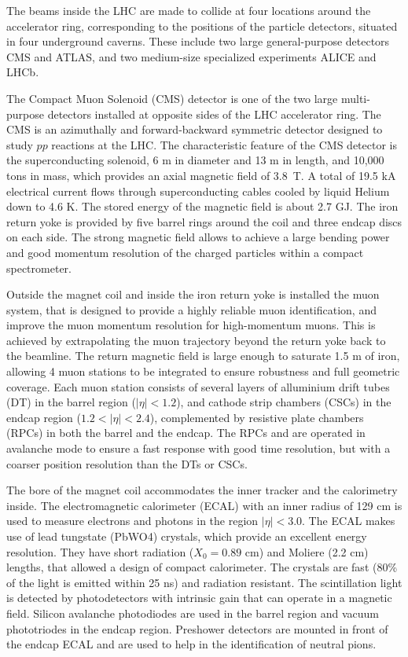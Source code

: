 The beams inside the LHC are made to collide at four locations around the accelerator ring, corresponding 
to the positions of the particle detectors, situated in four underground caverns. These include two large 
general-purpose detectors CMS and ATLAS, and two medium-size specialized experiments ALICE and LHCb.

The Compact Muon Solenoid (CMS) detector is one of the two large multi-purpose detectors 
installed at opposite sides of the LHC accelerator ring. 
The CMS is an azimuthally and forward-backward symmetric 
detector designed to study $pp$ reactions at the LHC.
The characteristic feature of the CMS detector is the superconducting
solenoid, 6 m in diameter and 13 m in length, and 10,000 tons in mass, 
which provides an axial magnetic field of 3.8~T. A total of 19.5 kA electrical current flows through 
superconducting cables cooled by liquid Helium down to 4.6 K.
The stored energy of the magnetic field is about 2.7 GJ.
The iron return yoke is provided by five barrel rings around the coil and three endcap discs on each side. 
The strong magnetic field allows to achieve a large bending power and good 
momentum resolution of the charged particles within a compact spectrometer. 

Outside the magnet coil and inside the iron return yoke is installed the muon system, that 
is designed to provide a highly reliable muon identification, and
improve the muon momentum resolution for high-momentum muons. 
This is achieved by extrapolating 
the muon trajectory beyond the return yoke back to the beamline.
The return magnetic field is large enough
to saturate 1.5 m of iron, allowing 4 muon stations to be integrated to ensure robustness
and full geometric coverage. Each muon station consists of several layers of alluminium drift
tubes (DT) in the barrel region ($|\eta| < 1.2$),
 and cathode strip chambers (CSCs) in the endcap region 
($1.2 < |\eta| < 2.4$),
complemented by resistive plate chambers (RPCs) in 
both the barrel and the endcap. The RPCs 
and are operated in avalanche mode to ensure a fast response 
with good time resolution, 
but with a coarser position resolution than the DTs or CSCs.

The bore of the magnet coil accommodates the inner tracker and the
calorimetry inside. 
The electromagnetic calorimeter (ECAL) with an inner radius of 129 cm
is used to measure electrons and photons in the region $|\eta| < 3.0$.
The ECAL makes use of lead tungstate (PbWO4) crystals, which 
provide an excellent energy resolution. They have short radiation
($X_0 = 0.89$ cm) and Moliere (2.2 cm) lengths, that allowed a design of compact calorimeter.
The crystals are fast (80\% of the light is emitted within 25 ns) and radiation resistant. 
The scintillation light is detected by photodetectors with intrinsic gain that can operate in a magnetic field.
Silicon avalanche
photodiodes are used in the barrel region and vacuum phototriodes in the endcap region. 
Preshower detectors are mounted in front of the endcap ECAL and are used to help in the identification 
of neutral pions.

